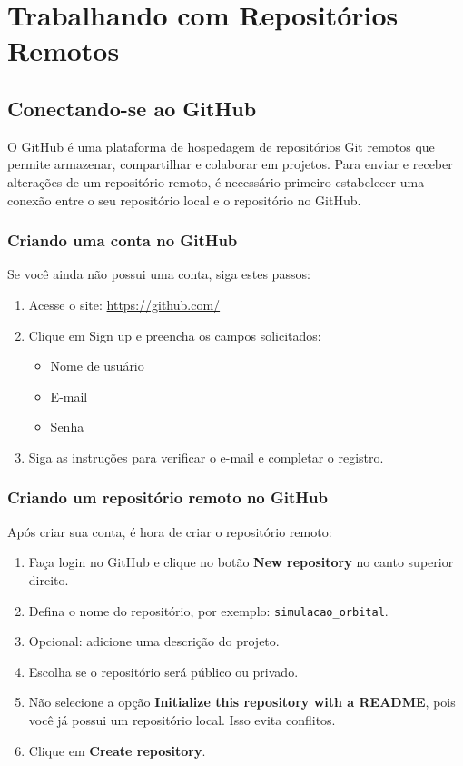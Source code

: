 \newpage
\section{Trabalhando com Repositórios Remotos}
\subsection{Conectando-se ao GitHub}

O GitHub é uma plataforma de hospedagem de repositórios Git remotos que permite armazenar, compartilhar e colaborar em projetos. Para enviar e receber alterações de um repositório remoto, é necessário primeiro estabelecer uma conexão entre o seu repositório local e o repositório no GitHub.

\subsubsection*{Criando uma conta no GitHub}

Se você ainda não possui uma conta, siga estes passos:

\begin{enumerate}
    \item Acesse o site: \url{https://github.com/}
    \item Clique em Sign up e preencha os campos solicitados:
    \begin{itemize}
        \item Nome de usuário
        \item E-mail
        \item Senha
    \end{itemize}
    \item Siga as instruções para verificar o e-mail e completar o registro.
\end{enumerate}

\subsubsection*{Criando um repositório remoto no GitHub}

Após criar sua conta, é hora de criar o repositório remoto:

\begin{enumerate}
    \item Faça login no GitHub e clique no botão \textbf{New repository} no canto superior direito.
    \item Defina o nome do repositório, por exemplo: \texttt{simulacao\_orbital}.
    \item Opcional: adicione uma descrição do projeto.
    \item Escolha se o repositório será público ou privado.
    \item Não selecione a opção \textbf{Initialize this repository with a README}, pois você já possui um repositório local. Isso evita conflitos.
    \item Clique em \textbf{Create repository}.
\end{enumerate}

